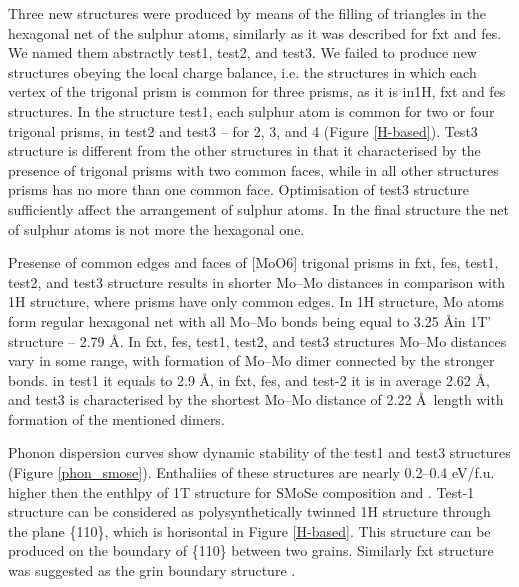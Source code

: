 \documentclass[a4paperm]{article}
\begin{document}
Three new structures were produced by means of the filling of triangles in the hexagonal net of the sulphur atoms, similarly as it was described for fxt and fes.
We named them abstractly test1, test2, and test3.
We failed to produce new structures obeying the local charge balance, i.e. the structures in which each vertex of the trigonal prism is common for three prisms, as it is in1H, fxt and fes structures.
In the structure test1, each sulphur atom is common for two or four trigonal prisms, in test2 and test3 – for 2, 3, and 4 (Figure \ref{H-based}).
Test3 structure is different from the other structures in that it characterised by the presence of trigonal prisms with two common faces, while in all other structures prisms has no more than one common face.
Optimisation of test3 structure sufficiently affect the arrangement of sulphur atoms.
In the final structure the net of sulphur atoms is not more the hexagonal one.

Presense of common edges and faces of [MoO6] trigonal prisms in fxt, fes, test1, test2, and test3 structure results in shorter Mo--Mo distances in comparison with 1H structure, where prisms have only common edges.
In 1H structure, Mo atoms form regular hexagonal net with all Mo--Mo bonds being equal to 3.25 \AA in 1T' structure -- 2.79 \AA.
In fxt, fes, test1, test2, and test3 structures Mo--Mo distances vary in some range, with formation of Mo--Mo dimer connected by the stronger bonds.
in test1 it equals to 2.9 \AA, in fxt, fes, and test-2 it is in average 2.62 \AA, and test3 is characterised by the shortest Mo--Mo distance of 2.22 \AA\ length with formation of the mentioned dimers.

Phonon dispersion curves show dynamic stability of the test1 and test3 structures (Figure \ref{phon_smose}).
Enthaliies of these structures are nearly 0.2--0.4 eV/f.u. higher then the enthlpy of 1T structure for SMoSe composition and .
Test-1 structure can be considered as polysynthetically twinned 1H structure through the plane \{110\}, which is horisontal in Figure \ref{H-based}.
This structure can be produced on the boundary of \{110\} between two grains.
Similarly fxt structure was suggested as the grin boundary structure \cite{}.
\end{document}
